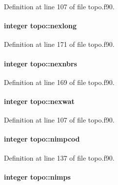 Definition at line 107 of file topo.\-f90.

\hypertarget{classtopo_a1f5e9cb69084b2315adb19fd0530be6a}{
\paragraph[{nexlong}]{\setlength{\rightskip}{0pt plus 5cm}integer topo\-::nexlong}}\label{classtopo_a1f5e9cb69084b2315adb19fd0530be6a}


Definition at line 171 of file topo.\-f90.

\hypertarget{classtopo_adffc0d2559b13aa47e04b6480b856654}{
\paragraph[{nexnbrs}]{\setlength{\rightskip}{0pt plus 5cm}integer topo\-::nexnbrs}}\label{classtopo_adffc0d2559b13aa47e04b6480b856654}


Definition at line 169 of file topo.\-f90.

\hypertarget{classtopo_ade6597c2219c875b950e07384990ac20}{
\paragraph[{nexwat}]{\setlength{\rightskip}{0pt plus 5cm}integer topo\-::nexwat}}\label{classtopo_ade6597c2219c875b950e07384990ac20}


Definition at line 107 of file topo.\-f90.

\hypertarget{classtopo_a482e71c286dc7f192d4b77e7b7371bfc}{
\paragraph[{nimpcod}]{\setlength{\rightskip}{0pt plus 5cm}integer topo\-::nimpcod}}\label{classtopo_a482e71c286dc7f192d4b77e7b7371bfc}


Definition at line 137 of file topo.\-f90.

\hypertarget{classtopo_a316b9321482ea8b4d578dce01da31d9e}{
\paragraph[{nimps}]{\setlength{\rightskip}{0pt plus 5cm}integer topo\-::nimps}}\label{classtopo_a316b9321482ea8b4d578dce01da31d9e}


